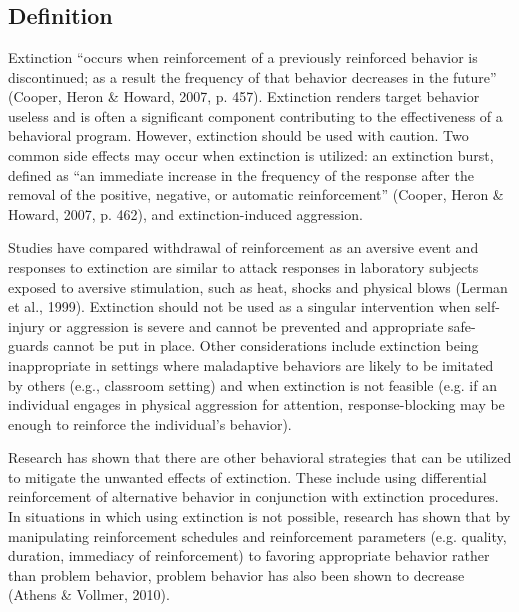\section[\fourcThree{}]{\fourcThree{}%
              }
\subsection{Definition}
Extinction ``occurs when reinforcement of a previously reinforced behavior is discontinued; as a result the frequency of that behavior decreases in the future'' (Cooper, Heron \& Howard, 2007, p. 457). Extinction renders target behavior useless and is often a significant component contributing to the effectiveness of a behavioral program. However, extinction should be used with caution. Two common side effects may occur when extinction is utilized: an extinction burst, defined as ``an immediate increase in the frequency of the response after the removal of the positive, negative, or automatic reinforcement'' (Cooper, Heron \& Howard, 2007, p. 462), and extinction-induced aggression.

Studies have compared withdrawal of reinforcement as an aversive event and responses to extinction are similar to attack responses in laboratory subjects exposed to aversive stimulation, such as heat, shocks and physical blows (Lerman et al., 1999). Extinction should not be used as a singular intervention when self-injury or aggression is severe and cannot be prevented and appropriate safe-guards cannot be put in place. Other considerations include extinction being inappropriate in settings where maladaptive behaviors are likely to be imitated by others (e.g., classroom setting) and when extinction is not feasible (e.g. if an individual engages in physical aggression for attention, response-blocking may be enough to reinforce the individual's behavior). 

Research has shown that there are other behavioral strategies that can be utilized to mitigate the unwanted effects of extinction. These include using differential reinforcement of alternative behavior in conjunction with extinction procedures. In situations in which using extinction is not possible, research has shown that by manipulating reinforcement schedules and reinforcement parameters (e.g. quality, duration, immediacy of reinforcement) to favoring appropriate behavior rather than problem behavior, problem behavior has also been shown to decrease (Athens \& Vollmer, 2010).
%
